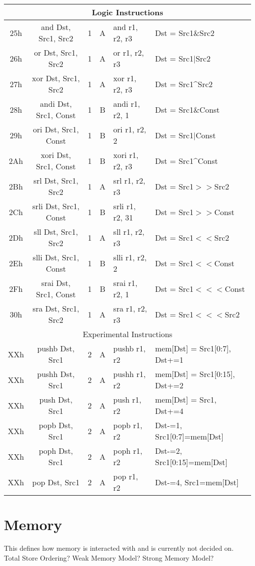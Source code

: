 \documentclass[]{article}
\begin{document}
\begin{longtable}{|c|c|l|c|l|p{5cm}|}
	\hline
	\multicolumn{6}{|c|}{Logic Instructions} \\
	\hline
	25h & and Dst, Src1, Src2 & 1 & A & and r1, r2, r3 & Dst = Src1\&Src2 \\
	\hline
	26h & or Dst, Src1, Src2 & 1 & A & or r1, r2, r3 & Dst = Src1$|$Src2 \\
	\hline
	27h & xor Dst, Src1, Src2 & 1 & A & xor r1, r2, r3 & Dst = Src1\string^Src2 \\
	\hline
	28h & andi Dst, Src1, Const & 1 & B & andi r1, r2, 1 & Dst = Src1\&Const \\
	\hline
	29h & ori Dst, Src1, Const & 1 & B & ori r1, r2, 2 & Dst = Src1$|$Const \\
	\hline
	2Ah & xori Dst, Src1, Const & 1 & B & xori r1, r2, r3 & Dst = Src1\string^Const \\
	\hline
	2Bh & srl Dst, Src1, Src2 & 1 & A & srl r1, r2, r3 & Dst = Src1$>>$Src2 \\
	\hline
	2Ch & srli Dst, Src1, Const & 1 & B & srli r1, r2, 31 & Dst = Src1$>>$Const \\
	\hline
	2Dh & sll Dst, Src1, Src2 & 1 & A & sll r1, r2, r3 & Dst = Src1$<<$Src2 \\
	\hline
	2Eh & slli Dst, Src1, Const & 1 & B & slli r1, r2, 2 & Dst = Src1$<<$Const \\
	\hline
	2Fh & srai Dst, Src1, Const & 1 & B & srai r1, r2, 1 & Dst = Src1$<<<$Const \\
	\hline
	30h & sra Dst, Src1, Src2 & 1 & A & sra r1, r2, r3 & Dst = Src1$<<<$Src2 \\
	\hline
	\multicolumn{6}{|c|}{Experimental Instructions} \\
	\hline
	XXh & pushb Dst, Src1 & 2 & A & pushb r1, r2 & mem[Dst] = Src1[0:7], Dst+=1 \\
	\hline
	XXh & pushh Dst, Src1 & 2 & A & pushh r1, r2 & mem[Dst] = Src1[0:15], Dst+=2 \\
	\hline
	XXh & push Dst, Src1 & 2 & A & push r1, r2 & mem[Dst] = Src1, Dst+=4 \\
	\hline
	XXh & popb Dst, Src1 & 2 & A & popb r1, r2 & Dst-=1, Src1[0:7]=mem[Dst] \\
	\hline
	XXh & poph Dst, Src1 & 2 & A & poph r1, r2 & Dst-=2, Src1[0:15]=mem[Dst] \\
	\hline
	XXh & pop Dst, Src1 & 2 & A & pop r1, r2 & Dst-=4, Src1=mem[Dst] \\
	\hline
\end{longtable}

\section{Memory}
This defines how memory is interacted with and is currently not decided on.
Total Store Ordering? Weak Memory Model? Strong Memory Model?
\end{document}
